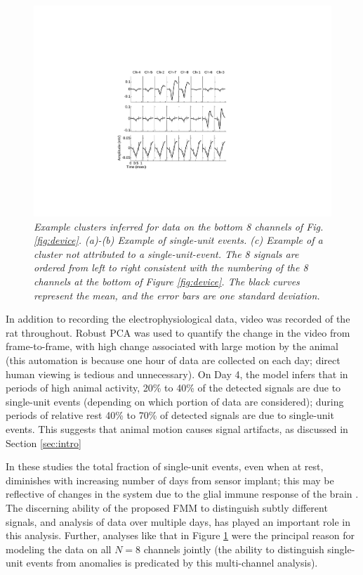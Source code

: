 \documentclass[journal]{IEEEtran}
\begin{document}
\begin{figure}[h!]
  \centering
    \includegraphics[width=1.0\linewidth]{figs_new/singleunits.pdf}
\caption{\label{fig:units}\small{\emph{Example
clusters inferred for data on the bottom 8 channels of Fig.
\ref{fig:device}. (a)-(b) Example of single-unit events. (c) Example
of a cluster \emph{not} attributed to a single-unit-event. The 8
signals are ordered from left to right consistent with the numbering
of the 8 channels at the bottom of Figure \ref{fig:device}. The black curves represent the mean, and the error bars are one standard deviation.}}}
\label{fig:units}
\end{figure}
In addition to recording the electrophysiological data, video was recorded of the rat throughout. Robust PCA \cite{Wright09} was used to quantify the change in the video from frame-to-frame, with high change associated with large motion by the animal (this automation is  because one hour of data are collected on each day; direct human viewing is tedious and unnecessary). On Day 4, the model infers that in periods of high animal activity, 20\% to 40\% of the detected signals are due to single-unit events (depending on which portion of data are considered); during periods of relative rest 40\% to 70\% of detected signals are due to single-unit events. This suggests that animal motion causes signal artifacts, as discussed in Section \ref{sec:intro}


In these studies the total fraction of single-unit events, even when at rest, diminishes with increasing number of days from sensor implant; this may be reflective of changes in the system due to the glial immune response of the brain \cite{Biran,Szarowski03}. The discerning ability of the proposed FMM to distinguish subtly different signals, and analysis of data over multiple days, has played an important role in this analysis. Further,  analyses like that in Figure \ref{fig:units} were the principal reason for modeling the data on all $N=8$ channels jointly (the ability to distinguish single-unit events from anomalies is predicated by this multi-channel analysis).
\end{document}
